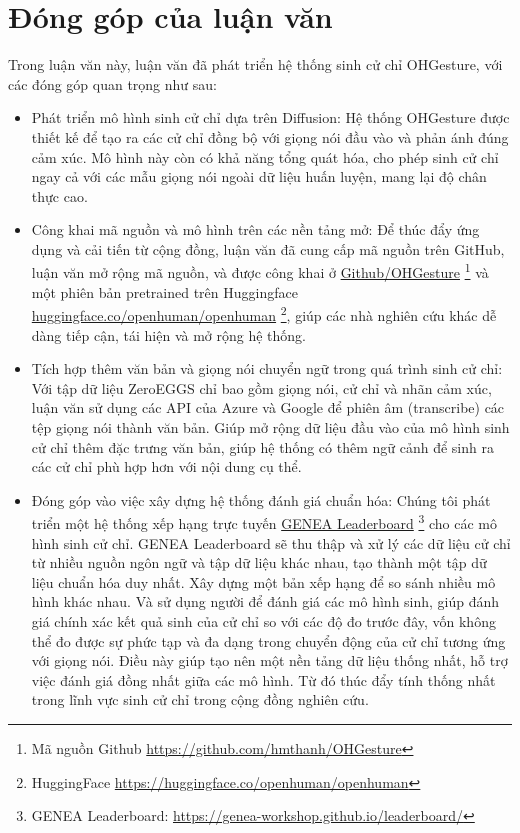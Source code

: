 \section{Đóng góp của luận văn}
\label{sec:contribution}

Trong luận văn này, luận văn đã phát triển hệ thống sinh cử chỉ OHGesture, với các đóng góp quan trọng như sau:

\begin{itemize}
	\item Phát triển mô hình sinh cử chỉ dựa trên Diffusion: Hệ thống OHGesture được thiết kế để tạo ra các cử chỉ đồng bộ với giọng nói đầu vào và phản ánh đúng cảm xúc. Mô hình này còn có khả năng tổng quát hóa, cho phép sinh cử chỉ ngay cả với các mẫu giọng nói ngoài dữ liệu huấn luyện, mang lại độ chân thực cao.
	
	\item Công khai mã nguồn và mô hình trên các nền tảng mở: Để thúc đẩy ứng dụng và cải tiến từ cộng đồng, luận văn đã cung cấp mã nguồn trên GitHub, luận văn mở rộng mã nguồn, và được công khai ở \hyperlink{https://github.com/hmthanh/OHGesture}{Github/OHGesture} \footnote{Mã nguồn Github \url{https://github.com/hmthanh/OHGesture}} và một phiên bản pretrained trên Huggingface \hyperlink{https://huggingface.co/openhuman/openhuman}{huggingface.co/openhuman/openhuman} \footnote{HuggingFace \url{https://huggingface.co/openhuman/openhuman}}, giúp các nhà nghiên cứu khác dễ dàng tiếp cận, tái hiện và mở rộng hệ thống.
	
	\item Tích hợp thêm văn bản và giọng nói chuyển ngữ trong quá trình sinh cử chỉ: Với tập dữ liệu ZeroEGGS chỉ bao gồm giọng nói, cử chỉ và nhãn cảm xúc, luận văn sử dụng các API của Azure và Google để phiên âm (transcribe) các tệp giọng nói thành văn bản. Giúp mở rộng dữ liệu đầu vào của mô hình sinh cử chỉ thêm đặc trưng văn bản, giúp hệ thống có thêm ngữ cảnh để sinh ra các cử chỉ phù hợp hơn với nội dung cụ thể.
	
	\item Đóng góp vào việc xây dựng hệ thống đánh giá chuẩn hóa: Chúng tôi phát triển một hệ thống xếp hạng trực tuyến \hyperlink{https://genea-workshop.github.io/leaderboard/}{GENEA Leaderboard} \footnote{GENEA Leaderboard: \url{https://genea-workshop.github.io/leaderboard/}} \cite{nagy2024towards} cho các mô hình sinh cử chỉ. GENEA Leaderboard sẽ thu thập và xử lý các dữ liệu cử chỉ từ nhiều nguồn ngôn ngữ và tập dữ liệu khác nhau, tạo thành một tập dữ liệu chuẩn hóa duy nhất. Xây dựng một bản xếp hạng để so sánh nhiều mô hình khác nhau. Và sử dụng người để đánh giá các mô hình sinh, giúp đánh giá chính xác kết quả sinh của cử chỉ so với các độ đo trước đây, vốn không thể đo được sự phức tạp và đa dạng trong chuyển động của cử chỉ tương ứng với giọng nói. Điều này giúp tạo nên một nền tảng dữ liệu thống nhất, hỗ trợ việc đánh giá đồng nhất giữa các mô hình. Từ đó thúc đẩy tính thống nhất trong lĩnh vực sinh cử chỉ trong cộng đồng nghiên cứu.
	

\end{itemize}
